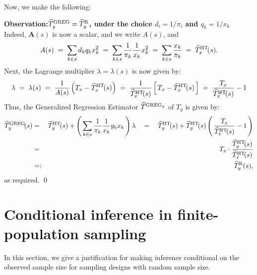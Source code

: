 \documentclass{article}
\begin{document}
\noindent
Now, we make the following:
\vskip 0.3cm
\begin{center}
\begin{minipage}{6.0in}
\noindent
\textbf{Observation:\quad$\widehat{T}^{\textnormal{GREG}}_{y} = \widehat{T}^{\textnormal{R}}_{y}$, under the choice $d_{i} = 1/\pi_{i}$ and $q_{k} = 1/x_{k}$}
\vskip 0.1cm
Indeed, $\mathbf{A}(s)$ is now a scalar, and we write $A(s)$, and
\begin{equation*}
A(s)
\;=\; \sum_{k \in s}d_{k}q_{k}x_{k}^{2}
\;=\; \sum_{k \in s}\dfrac{1}{\pi_{k}}\dfrac{1}{x_{k}}x_{k}^{2}
\;=\; \sum_{k \in s}\dfrac{x_{k}}{\pi_{k}}
\;=\; \widehat{T}^{\textnormal{HT}}_{x}\!(s).
\end{equation*}
Next, the Lagrange multiplier $\lambda = \lambda(s)$ is now given by:
\begin{equation*}
\lambda \; = \; \lambda(s)
\;=\; \dfrac{1}{A(s)}\left(T_{x} - \widehat{T}^{\textnormal{HT}}_{x}\!(s)\right)
\;=\; \dfrac{1}{\widehat{T}^{\textnormal{HT}}_{x}\!(s)}\left[\,T_{x} - \widehat{T}^{\textnormal{HT}}_{x}\!(s)\,\right]
\;=\; \dfrac{T_{x}}{\widehat{T}^{\textnormal{HT}}_{x}\!(s)} - 1
\end{equation*}
Thus, the Generalized Regression Estimator $\widehat{T}^{\textnormal{GREG}_{y}}$ of $T_{y}$ is given by:
\begin{eqnarray*}
\widehat{T}^{\textnormal{GREG}}_{y}\!(s)
&=& \widehat{T}^{\textnormal{HT}}_{y}\!(s) + \left(\,\sum_{k\in s}\dfrac{1}{\pi_{k}}\dfrac{1}{x_{k}}y_{k}x_{k}\,\right)\lambda
\quad=\quad \widehat{T}^{\textnormal{HT}}_{y}\!(s) + \widehat{T}^{\textnormal{HT}}_{y}\!(s)\left(\,\dfrac{T_{x}}{\widehat{T}^{\textnormal{HT}}_{x}\!(s)} - 1\,\right)\\
&=& T_{x}\cdot\dfrac{\widehat{T}^{\textnormal{HT}}_{y}\!(s)}{\widehat{T}^{\textnormal{HT}}_{x}\!(s)} \\
&=:& \widehat{T}^{\textnormal{R}}_{y}(s),
\end{eqnarray*}
as required. \qed
\end{minipage}
\end{center}


\section{Conditional inference in finite-population sampling}
\setcounter{theorem}{0}

In this section, we give a justification for making inference conditional on the observed sample size
for sampling designs with random sample size.
\end{document}
